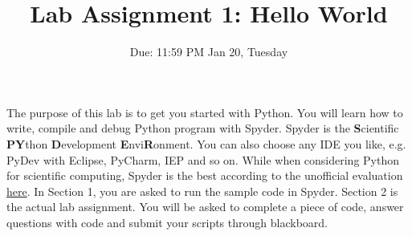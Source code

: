 \documentclass[a4paper, 11pt]{article}
\title{ Lab Assignment 1: Hello World}
\author{Due: 11:59 PM Jan 20, Tuesday}
\date{}
\begin{document}
\maketitle
The purpose of this lab is to get you started with Python. You will learn how to write, compile and debug Python program with Spyder. Spyder is the {\bf S}cientific {\bf PY}thon {\bf D}evelopment {\bf E}nvi{\bf R}onment. You can also choose any IDE you like, e.g. PyDev with Eclipse, PyCharm, IEP and so on. While when considering Python for scientific computing, Spyder is the best according to the unofficial evaluation \href{http://xcorr.net/2013/04/17/evaluating-ides-for-scientific-python/}{here}. In Section 1, you are asked to run the sample code in Spyder. Section 2 is the actual lab assignment. You will be asked to complete a piece of code, answer questions with code and submit your scripts through blackboard. 
\end{document}
